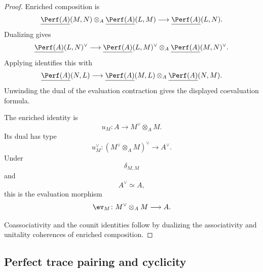 \begin{proof}
Enriched composition is
\[
\begin{aligned}
    \underline{\Perf(A)}(M,N)
    \otimes_A
    \underline{\Perf(A)}(L,M)
    \longrightarrow
    \underline{\Perf(A)}(L,N).
\end{aligned}
\]
Dualizing gives
\[
\begin{aligned}
    \underline{\Perf(A)}(L,N)^\vee
    \longrightarrow
    \underline{\Perf(A)}(L,M)^\vee
    \otimes_A
    \underline{\Perf(A)}(M,N)^\vee.
\end{aligned}
\]
Applying
identifies this with
\[
\begin{aligned}
    \underline{\Perf(A)}(N,L)
    \longrightarrow
    \underline{\Perf(A)}(M,L)
    \otimes_A
    \underline{\Perf(A)}(N,M).
\end{aligned}
\]
Unwinding the dual of the evaluation contraction gives the displayed
coevaluation formula.

The enriched identity is
\[
    u_M
    \colon
    A
    \longrightarrow
    M^\vee\otimes_A M.
\]
Its dual has type
\[
    u_M^\vee
    \colon
    (M^\vee\otimes_A M)^\vee
    \longrightarrow
    A^\vee.
\]
Under
\[
    \delta_{M,M}
\]
and
\[
    A^\vee\simeq A,
\]
this is the evaluation morphism
\[
    \ev_M
    \colon
    M^\vee\otimes_A M
    \longrightarrow
    A.
\]

Coassociativity and the counit identities follow by dualizing the
associativity and unitality coherences of enriched composition.
\end{proof}


\subsection{Perfect trace pairing and cyclicity}


